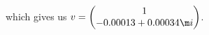 \documentclass[preview]{standalone}
\begin{document}
\begin{center}
\raggedright
                which gives us \(v = \begin{pmatrix}
                                1 \\
                                -0.00013 + 0.00034\m i
                            \end{pmatrix}\).
\end{center}
\end{document}
